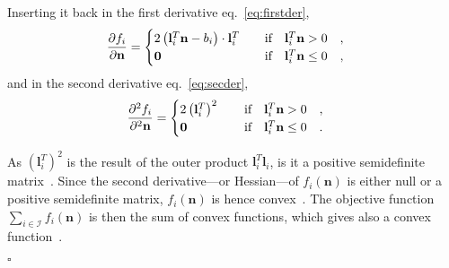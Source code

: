 Inserting it back in the first derivative eq.~\eqref{eq:firstder},
\begin{equation}
\frac{\partial f_i}{\partial {\bf n}} = \begin{cases}
2 \left( \mathbf{l}_i^T \mathbf{n} - b_i \right) \cdot \mathbf{l}_i^T  \qquad\text{if} \quad \mathbf{l}_i^T \mathbf{n} > 0 \quad, \\
\mathbf{0} \hfill  \qquad\text{if} \quad \mathbf{l}_i^T \mathbf{n} \leq 0 \quad,
\end{cases} \\
\label{eq:d1ps}
\end{equation}
and in the second derivative eq.~\eqref{eq:secder},
\begin{equation}
\frac{\partial ^2 f_i}{\partial ^2 {\bf n}} = \begin{cases}
2 \left( \mathbf{l}_i^T \right) ^2 \qquad\text{if} \quad \mathbf{l}_i^T \mathbf{n} > 0 \quad, \\
\mathbf{0} \hfill  \qquad\text{if} \quad \mathbf{l}_i^T \mathbf{n} \leq 0 \quad.
\end{cases} \\
\label{eq:d2ps}
\end{equation}

As $\left( \mathbf{l}_i^T\right)^2$ is the result of the outer product $\mathbf{l}_i^T \mathbf{l}_i$, is it a positive semidefinite matrix~\cite{schwerdtfeger1950introduction}. Since the second derivative---or Hessian---of $f_i(\mathbf{n})$ is either null or a positive semidefinite matrix, $f_i(\mathbf{n})$ is hence convex~\cite{schwerdtfeger1950introduction}. The objective function $\sum_{i \in \mathcal{I}} f_i(\mathbf{n})$ is then the sum of convex functions, which gives also a convex function~\cite{schwerdtfeger1950introduction}.

\null\hfill$\square$


